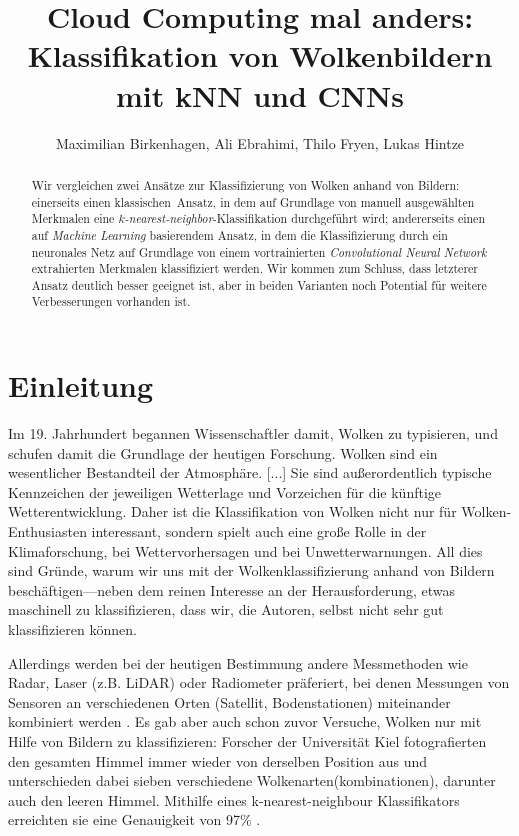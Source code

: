 \documentclass[a4,german]{article}
\begin{document}
\title{Cloud Computing mal anders: Klassifikation von Wolkenbildern mit kNN und CNNs}
\author{Maximilian Birkenhagen, Ali Ebrahimi, Thilo Fryen, Lukas Hintze}
\maketitle

\begin{abstract}
    Wir vergleichen zwei Ansätze zur Klassifizierung von Wolken anhand von Bildern:
        einerseits einen \glqq klassischen\grqq\ Ansatz, in dem auf Grundlage von manuell ausgewählten Merkmalen eine \emph{$k$-nearest-neighbor}-Klassifika\-tion durchgeführt wird;
        andererseits einen auf \emph{Machine Learning} basierendem Ansatz, in dem die Klassifizierung durch ein neuronales Netz auf Grundlage von einem vortrainierten \emph{Convolutional Neural Network} extrahierten Merkmalen klassifiziert werden.
    Wir kommen zum Schluss, dass letzterer Ansatz deutlich besser geeignet ist, aber in beiden Varianten noch Potential für weitere Verbesserungen vorhanden ist.
\end{abstract}

\section{Einleitung}

Im 19. Jahrhundert begannen Wissenschaftler damit, Wolken zu typisieren, und schufen damit die Grundlage der heutigen Forschung.
\glqq Wolken sind ein wesentlicher Bestandteil der Atmosphäre. [...] Sie sind außerordentlich typische Kennzeichen der jeweiligen Wetterlage und Vorzeichen für die künftige Wetterentwicklung.\grqq\cite{wolkenatlas:Karlsruhe}
Daher ist die Klassifikation von Wolken nicht nur für Wolken-Enthusiasten interessant, sondern spielt auch eine große Rolle in der Klimaforschung, bei Wettervorhersagen und bei Unwetterwarnungen.
All dies sind Gründe, warum wir uns mit der Wolkenklassifizierung anhand von Bildern beschäftigen---neben dem reinen Interesse an der Herausforderung, etwas maschinell zu klassifizieren, dass wir, die Autoren, selbst nicht sehr gut klassifizieren können.

Allerdings werden bei der heutigen Bestimmung andere Messmethoden wie Radar, Laser (z.B. LiDAR) oder Radiometer präferiert, bei denen Messungen von Sensoren an verschiedenen Orten (Satellit, Bodenstationen) miteinander kombiniert werden \cite{wang}.
Es gab aber auch schon zuvor Versuche, Wolken nur mit Hilfe von Bildern zu klassifizieren:
Forscher der Universität Kiel fotografierten den gesamten Himmel immer wieder von derselben Position aus und unterschieden dabei sieben verschiedene Wolkenarten(kombinationen), darunter auch den \glqq leeren Himmel\grqq.
Mithilfe eines k-nearest-neighbour Klassifikators erreichten sie eine Genauigkeit von 97\% \cite{heinle}.
\end{document}
